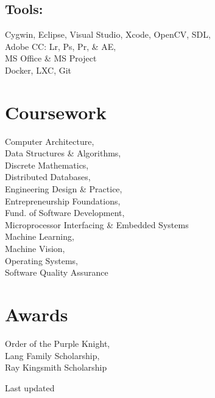 \documentclass[]{hieudo-build}
\begin{document}
\begin{minipage}[t]{0.3\textwidth}
\subsection{Tools:}
Cygwin, Eclipse, Visual Studio, 
Xcode, OpenCV, SDL, \\
Adobe CC: Lr, Ps, Pr, \& AE, \\
MS Office \& MS Project \\ 
Docker, LXC, Git\\

\sectionsep



\section{Coursework}
Computer Architecture, \\
Data Structures \& Algorithms,\\
Discrete Mathematics, \\
Distributed Databases, \\
Engineering Design \& Practice,\\
Entrepreneurship Foundations,\\
Fund. of Software Development,\\
Microprocessor Interfacing
\& Embedded Systems \\
Machine Learning, \\
Machine Vision,\\
Operating Systems,\\
Software Quality Assurance\\
\sectionsep

\section{Awards}
Order of the Purple Knight,\\
Lang Family Scholarship, \\
Ray Kingsmith Scholarship \\
\sectionsep

Last updated 

%
%
\end{minipage} 
\end{document}
